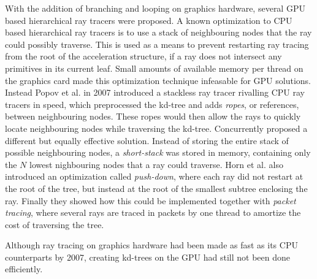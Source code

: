 With the addition of branching and looping on graphics hardware, several GPU
based hierarchical ray tracers were proposed. A known optimization to CPU based
hierarchical ray tracers is to use a stack of neighbouring nodes that the ray
could possibly traverse. This is used as a means to prevent restarting ray
tracing from the root of the acceleration structure, if a ray does not intersect
any primitives in its current leaf. Small amounts of available memory per thread
on the graphics card made this optimization technique infeasable for GPU
solutions. Instead Popov et al. in 2007 introduced a
stackless ray tracer rivalling CPU ray tracers in speed, which preprocessed the
kd-tree and adds \textit{ropes}, or references, between neighbouring
nodes. These ropes would then allow the rays to quickly locate neighbouring
nodes while traversing the kd-tree. Concurrently \horn{} proposed a different
but equally effective solution. Instead of storing the entire stack of possible
neighbouring nodes, a \textit{short-stack} was stored in memory, containing only
the $N$ lowest nighbouring nodes that a ray could traverse. Horn et al. also
introduced an optimization called \textit{push-down}, where each ray did not
restart at the root of the tree, but instead at the root of the smallest subtree
enclosing the ray. Finally they showed how this could be implemented together
with \textit{packet tracing}, where several rays are traced in packets by one
thread to amortize the cost of traversing the tree.




Although ray tracing on graphics hardware had been made as fast as its CPU
counterparts by 2007, creating kd-trees on the GPU had still not been done
efficiently.

